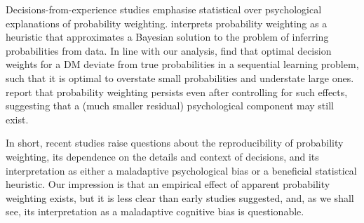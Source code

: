 \documentclass[a4paper, 12pt]{article}
\newcommand{\seclabel}[1]{\label{sec:#1}}
\newcommand{\MK}[1]{\textcolor{red}{\textit{***MK: #1 MK***}}}
\begin{document}
Decisions-from-experience studies emphasise statistical over psychological explanations of probability weighting. \textcite{Martins2006} interprets probability weighting as a heuristic that approximates a Bayesian solution to the problem of inferring probabilities from data. In line with our analysis, \textcite{SeoETAL2019} find that optimal decision weights for a DM deviate from true probabilities in a sequential learning problem, such that it is optimal to overstate small probabilities and understate large ones. \textcite{FoxHadar2006,UngemachETAL2009} report that probability weighting persists even after controlling for such effects, suggesting that a (much smaller residual) psychological component may still exist.

In short, recent studies raise questions about the reproducibility of probability weighting, its dependence on the details and context of decisions, and its interpretation as either a maladaptive psychological bias or a beneficial statistical heuristic. Our impression is that an empirical effect of apparent probability weighting exists, but it is less clear than early studies suggested, and, as we shall see, its interpretation as a maladaptive cognitive bias is questionable.


\end{document}
